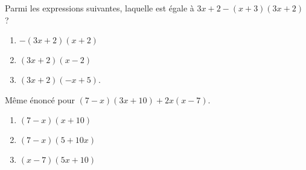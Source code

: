 
\begin{exercice}\label{exosmath-0343}

    Parmi les expressions suivantes, laquelle est égale à \( 3x+2-(x+3)(3x+2)\) ?
    \begin{enumerate}
        \item
            \( -(3x+2)(x+2)\)
        \item
            \( (3x+2)(x-2)\)
        \item
            \( (3x+2)(-x+5)\).
    \end{enumerate}
    Même énoncé pour \( (7-x)(3x+10)+2x(x-7)\).
    \begin{enumerate}
        \item
            \( (7-x)(x+10)\)
        \item
            \( (7-x)(5+10x)\)
        \item
            \( (x-7)(5x+10)\)
    \end{enumerate}

\end{exercice}
